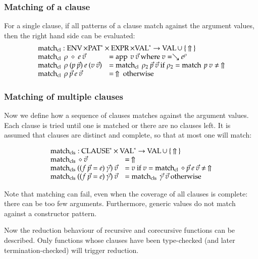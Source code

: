 \subsubsection{Matching of a clause}
For a single clause, if all patterns of a clause match against the argument values, then the right hand side can be evaluated: 
\[
\begin{array}{ll}
\multicolumn{2}{l}{\matchcl : \Env \times \ves{\Pat} \times \Expr \times \ves{\Val} \ra \Val \cup \: \{ \: \stuck \: \} }\\
\matchcl \: \rho \: \diamond \: e \: \vec{v} & = \ap \: v \: \vec{v} \mbox{ where } v = \wh \cl{e}{\rho} \\
\matchcl \: \rho \: (p \: \vec{p}) \: e \: (v \: \vec{v}) & = \matchcl \: \rho_2 \: \vec{p} \: \vec{v} \mbox{ if } \rho_2 = \match \: p \: v \neq \: \stuck \\  
\matchcl \: \rho \: \vec{p}\: e \: \vec{v} & = \: \stuck \mbox{ otherwise}\\  
\end{array}
\]

\subsubsection{Matching of multiple clauses} 
Now we define how a sequence of clauses matches against the argument values. 
Each clause is tried until one is matched or there are no clauses left. It is assumed that clauses are distinct and complete, so that at most one will match:

\[
\begin{array}{ll}
\multicolumn{2}{l}{\matchcls : \ves{\Clause} \times \ves{\Val} \ra \Val \cup \: \{ \: \stuck \: \} }\\
\matchcls \: \diamond \: \vec{v} & = \: \stuck \\
\matchcls \:  ((f \: \vec{p} = e)\:\vec{\gamma}) \: \vec{v} & = v \mbox{ if } v = \matchcl \: \diamond \: \vec{p} \: e \:  \vec{v} \neq \: \stuck \\
\matchcls \: ((f \: \vec{p} = e) \:\vec{\gamma}) \: \vec{v} & = \matchcls \: \vec{\gamma} \: \vec{v} \mbox{ otherwise}  
\end{array}
\]

Note that matching can fail, even when the coverage of all clauses is complete: there can be too few arguments. Furthermore, generic values do not match against a constructor pattern. 

Now the reduction behaviour of recursive and corecursive functions can be described.
Only functions whose clauses have been type-checked (and later termination-checked) will trigger reduction.

